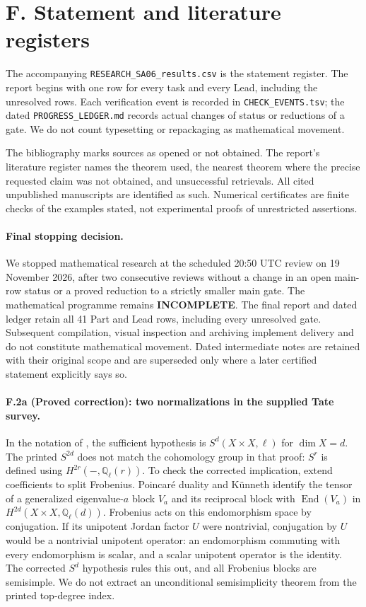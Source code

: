 \section{F. Statement and literature registers}
The accompanying \texttt{RESEARCH\_SA06\_results.csv} is the statement
register. The report begins with one row for every task and every Lead,
including the unresolved rows. Each verification event is recorded in
\texttt{CHECK\_EVENTS.tsv}; the dated \texttt{PROGRESS\_LEDGER.md} records
actual changes of status or reductions of a gate. We do not count
typesetting or repackaging as mathematical movement.

The bibliography marks sources as opened or not obtained. The report's
literature register names the theorem used, the nearest theorem where the
precise requested claim was not obtained, and unsuccessful retrievals.
All cited unpublished manuscripts are identified as such. Numerical
certificates are finite checks of the examples stated, not experimental
proofs of unrestricted assertions.

\paragraph{Final stopping decision.}
We stopped mathematical research at the scheduled 20:50 UTC review on
19 November 2026, after two consecutive reviews without a change in an
open main-row status or a proved reduction to a strictly smaller main gate.
The mathematical programme remains \textbf{INCOMPLETE}.
The final report and dated ledger retain all 41 Part and Lead rows,
including every unresolved gate. Subsequent compilation, visual inspection
and archiving implement delivery and do not constitute mathematical movement.
Dated intermediate notes are retained with their original scope and are
superseded only where a later certified statement explicitly says so.

\paragraph{F.2a (Proved correction): two normalizations in the supplied Tate survey.}
In the notation of \citet[Theorem 1.6 and its proof, p.~3]{rootMilneTate2007},
the sufficient hypothesis is $S^d(X\times X,\ell)$ for $\dim X=d$.
The printed $S^{2d}$ does not match the cohomology group in that proof:
$S^r$ is defined using $H^{2r}(-,\mathbb Q_\ell(r))$.
To check the corrected implication, extend coefficients to split
Frobenius. Poincar\'e duality and K\"unneth identify the tensor of
a generalized eigenvalue-$a$ block $V_a$ and its reciprocal block
with $\operatorname{End}(V_a)$ in
$H^{2d}(X\times X,\mathbb Q_\ell(d))$.
Frobenius acts on this endomorphism space by conjugation. If its
unipotent Jordan factor $U$ were nontrivial, conjugation by $U$
would be a nontrivial unipotent operator: an endomorphism commuting
with every endomorphism is scalar, and a scalar unipotent operator
is the identity. The corrected $S^d$ hypothesis rules this out,
and all Frobenius blocks are semisimple. We do not extract an
unconditional semisimplicity theorem from the printed top-degree
index.

